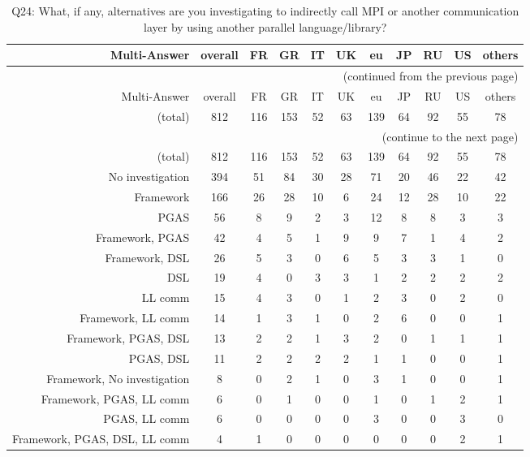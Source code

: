 \clearpage%
{\footnotesize\begin{landscape}%
\begin{longtable}[htb]{r|c|c|c|c|c|c|c|c|c|c}%
\caption{Q24: What, if any, alternatives are you investigating to indirectly call MPI or another communication layer by using another parallel language/library?}%
\label{tab:Q24-mans} \\%
\hline%
Multi-Answer & overall & FR & GR & IT & UK & eu & JP & RU & US & others \\
 \hline%
\endfirsthead%
\multicolumn{11}{r}{(continued from the previous page)}\\%
\hline%
Multi-Answer & overall & FR & GR & IT & UK & eu & JP & RU & US & others \\
 \hline%
\endhead%
\hline%
(total) & 812 & 116 & 153 & 52 & 63 & 139 & 64 & 92 & 55 & 78 \\%
\hline%
\multicolumn{11}{r}{(continue to the next page)}\\%
\endfoot%
\hline%
(total) & 812 & 116 & 153 & 52 & 63 & 139 & 64 & 92 & 55 & 78 \\%
\hline%
\endlastfoot%
\hline%
{No investigation} & 394 & 51 & 84 & 30 & 28 & 71 & 20 & 46 & 22 & 42 \\%
{Framework} & 166 & 26 & 28 & 10 & 6 & 24 & 12 & 28 & 10 & 22 \\%
{PGAS} & 56 & 8 & 9 & 2 & 3 & 12 & 8 & 8 & 3 & 3 \\%
{Framework, PGAS} & 42 & 4 & 5 & 1 & 9 & 9 & 7 & 1 & 4 & 2 \\%
{Framework, DSL} & 26 & 5 & 3 & 0 & 6 & 5 & 3 & 3 & 1 & 0 \\%
{DSL} & 19 & 4 & 0 & 3 & 3 & 1 & 2 & 2 & 2 & 2 \\%
{LL comm} & 15 & 4 & 3 & 0 & 1 & 2 & 3 & 0 & 2 & 0 \\%
{Framework, LL comm} & 14 & 1 & 3 & 1 & 0 & 2 & 6 & 0 & 0 & 1 \\%
{Framework, PGAS, DSL} & 13 & 2 & 2 & 1 & 3 & 2 & 0 & 1 & 1 & 1 \\%
{PGAS, DSL} & 11 & 2 & 2 & 2 & 2 & 1 & 1 & 0 & 0 & 1 \\%
{Framework, No investigation} & 8 & 0 & 2 & 1 & 0 & 3 & 1 & 0 & 0 & 1 \\%
{Framework, PGAS, LL comm} & 6 & 0 & 1 & 0 & 0 & 1 & 0 & 1 & 2 & 1 \\%
{PGAS, LL comm} & 6 & 0 & 0 & 0 & 0 & 3 & 0 & 0 & 3 & 0 \\%
{Framework, PGAS, DSL, LL comm} & 4 & 1 & 0 & 0 & 0 & 0 & 0 & 0 & 2 & 1 \\%

\end{longtable}
\end{landscape}}
